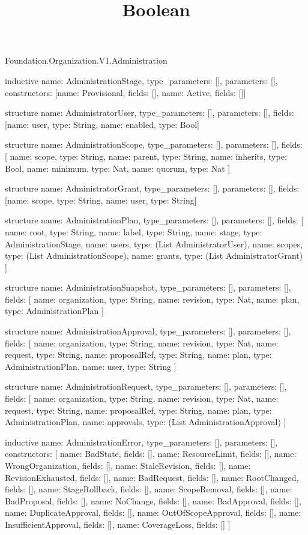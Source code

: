 \begin{lexlean}{Foundation.Organization.V1.Administration}
\title{Boolean}
\begin{semanticmodule}
inductive{
  name: AdministrationStage,
  type_parameters: [],
  parameters: [],
  constructors: [{name: Provisional, fields: []}, {name: Active, fields: []}]
}

structure{
  name: AdministratorUser,
  type_parameters: [],
  parameters: [],
  fields: [{name: user, type: String}, {name: enabled, type: Bool}]
}

structure{
  name: AdministrationScope,
  type_parameters: [],
  parameters: [],
  fields: [
    {name: scope, type: String},
    {name: parent, type: String},
    {name: inherits, type: Bool},
    {name: minimum, type: Nat},
    {name: quorum, type: Nat}
  ]
}

structure{
  name: AdministratorGrant,
  type_parameters: [],
  parameters: [],
  fields: [{name: scope, type: String}, {name: user, type: String}]
}

structure{
  name: AdministrationPlan,
  type_parameters: [],
  parameters: [],
  fields: [
    {name: root, type: String},
    {name: label, type: String},
    {name: stage, type: AdministrationStage},
    {name: users, type: (List AdministratorUser)},
    {name: scopes, type: (List AdministrationScope)},
    {name: grants, type: (List AdministratorGrant)}
  ]
}

structure{
  name: AdministrationSnapshot,
  type_parameters: [],
  parameters: [],
  fields: [
    {name: organization, type: String},
    {name: revision, type: Nat},
    {name: plan, type: AdministrationPlan}
  ]
}

structure{
  name: AdministrationApproval,
  type_parameters: [],
  parameters: [],
  fields: [
    {name: organization, type: String},
    {name: revision, type: Nat},
    {name: request, type: String},
    {name: proposalRef, type: String},
    {name: plan, type: AdministrationPlan},
    {name: user, type: String}
  ]
}

structure{
  name: AdministrationRequest,
  type_parameters: [],
  parameters: [],
  fields: [
    {name: organization, type: String},
    {name: revision, type: Nat},
    {name: request, type: String},
    {name: proposalRef, type: String},
    {name: plan, type: AdministrationPlan},
    {name: approvals, type: (List AdministrationApproval)}
  ]
}

inductive{
  name: AdministrationError,
  type_parameters: [],
  parameters: [],
  constructors: [
    {name: BadState, fields: []},
    {name: ResourceLimit, fields: []},
    {name: WrongOrganization, fields: []},
    {name: StaleRevision, fields: []},
    {name: RevisionExhausted, fields: []},
    {name: BadRequest, fields: []},
    {name: RootChanged, fields: []},
    {name: StageRollback, fields: []},
    {name: ScopeRemoval, fields: []},
    {name: BadProposal, fields: []},
    {name: NoChange, fields: []},
    {name: BadApproval, fields: []},
    {name: DuplicateApproval, fields: []},
    {name: OutOfScopeApproval, fields: []},
    {name: InsufficientApproval, fields: []},
    {name: CoverageLoss, fields: []}
  ]
}


\end{semanticmodule}
\end{lexlean}
